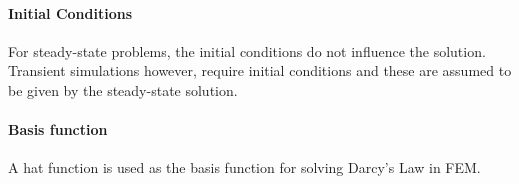 \paragraph{Initial Conditions}

For steady-state problems, the initial conditions do not influence the solution.
Transient simulations however, require initial conditions and these are assumed to be given by the steady-state solution.\par

\paragraph{Basis function}

A hat function is used as the basis function for solving Darcy's Law in FEM.\par
